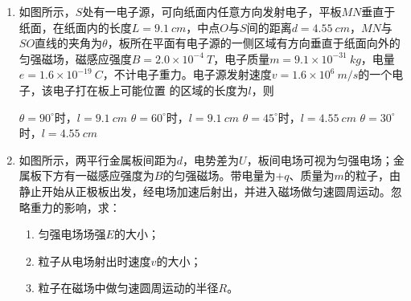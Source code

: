 \begin{enumerate}[leftmargin=0em]
\item
{}
如图所示，$ S $处有一电子源，可向纸面内任意方向发射电子，平板$ MN $垂直于纸面，在纸面内的长度$ L=9.1 \ cm $，中点$ O $与$ S $间的距离$ d=4.55 \ cm $，$ MN $与$ SO $直线的夹角为$ \theta $，板所在平面有电子源的一侧区域有方向垂直于纸面向外的匀强磁场，磁感应强度$ B=2.0 \times 10^{-4} \ T $，电子质量$ m=9.1 \times 10^{-31} \ kg $，电量$ e=1.6 \times 10^{-19}\ C $，不计电子重力。电子源发射速度$ v=1.6 \times 10^{6} \ m/s $的一个电子，该电子打在板上可能位置
的区域的长度为$ l $，则  
\begin{figure}[h!]
\centering

\end{figure}


\fourchoices
{$ \theta =90 ^{\circ} $时，$ l=9.1 \ cm $}
{$ \theta =60^{\circ} $时，$ l=9.1 \ cm $}
{$ \theta =45^{\circ} $时，$ l=4.55 \ cm $}
{$ \theta =30^{\circ} $时，$ l=4.55 \ cm $}




\newpage
\item
{}
如图所示，两平行金属板间距为$ d $，电势差为$ U $，板间电场可视为匀强电场；金属板下方有一磁感应强度为$ B $的匀强磁场。带电量为$ +q $、质量为$ m $的粒子，由静止开始从正极板出发，经电场加速后射出，并进入磁场做匀速圆周运动。忽略重力的影响，求：
\begin{enumerate}
\renewcommand{\labelenumi}{\arabic{enumi}.}
\item
匀强电场场强$ E $的大小；
\item 
粒子从电场射出时速度$ v $的大小；
\item 
粒子在磁场中做匀速圆周运动的半径$ R $。


\end{enumerate}
\begin{figure}[h!]
\flushright

\end{figure}

\end{enumerate}
